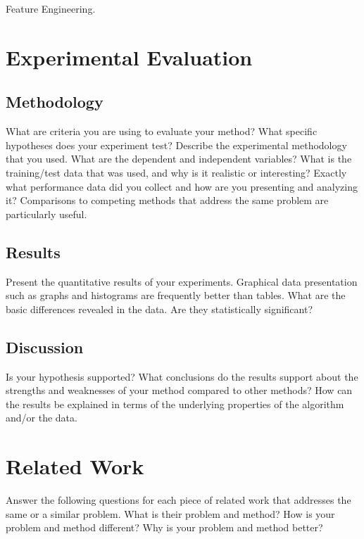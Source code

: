 \documentclass[conference,draft]{IEEEtran}
\begin{document}
Feature Engineering.

\section{Experimental Evaluation}

\subsection{Methodology}

\scriptsize{
What are criteria you are using to evaluate your method? What specific
hypotheses does your experiment test? Describe the experimental methodology
that you used. What are the dependent and independent variables? What is the
training/test data that was used, and why is it realistic or interesting?
Exactly what performance data did you collect and how are you presenting and
analyzing it? Comparisons to competing methods that address the same problem
are particularly useful. 
}\normalsize

\subsection{Results}

\scriptsize{
Present the quantitative results of your experiments. Graphical data
presentation such as graphs and histograms are frequently better than tables.
What are the basic differences revealed in the data. Are they statistically
significant? 
}\normalsize

\subsection{Discussion}

\scriptsize{
Is your hypothesis supported? What conclusions do the results support about the
strengths and weaknesses of your method compared to other methods? How can the
results be explained in terms of the underlying properties of the algorithm
and/or the data. 
}\normalsize

\section{Related Work}

\scriptsize{
Answer the following questions for each piece of related work that addresses
the same or a similar problem. What is their problem and method? How is your
problem and method different? Why is your problem and method better? 
}\normalsize
\end{document}
